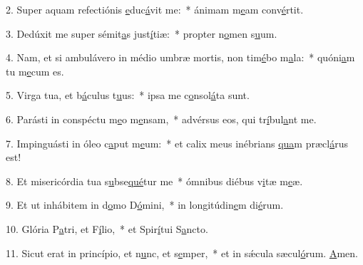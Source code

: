 2. Super aquam refectiónis \uline{e}duc\uline{á}vit me:~* ánimam m\uline{e}am conv\uline{é}rtit.\par 
3. Dedúxit me super sémit\uline{a}s just\uline{í}tiæ:~* propter n\uline{o}men s\uline{u}um.\par 
4. Nam, et si ambulávero in médio umbræ mortis, non tim\uline{é}bo m\uline{a}la:~* quóni\uline{a}m tu m\uline{e}cum es.\par 
5. Virga tua, et b\uline{á}culus t\uline{u}us:~* ipsa me c\uline{o}nsol\uline{á}ta sunt.\par 
6. Parásti in conspéctu m\uline{e}o m\uline{e}nsam,~* advérsus eos, qui tr\uline{í}bul\uline{a}nt me.\par 
7. Impinguásti in óleo c\uline{a}put m\uline{e}um:~* et calix meus inébrians \uline{qua}m præcl\uline{á}rus est!\par 
8. Et misericórdia tua s\uline{u}bse\uline{qué}tur me~* ómnibus diébus v\uline{i}tæ m\uline{e}æ.\par 
9. Et ut inhábitem in d\uline{o}mo D\uline{ó}mini,~* in longitúdin\uline{e}m di\uline{é}rum.\par 
10. Glória P\uline{a}tri, et F\uline{í}lio,~* et Spir\uline{í}tui S\uline{a}ncto.\par 
11. Sicut erat in princípio, et n\uline{u}nc, et s\uline{e}mper,~* et in sǽcula sæcul\uline{ó}rum. \uline{A}men.\par 
